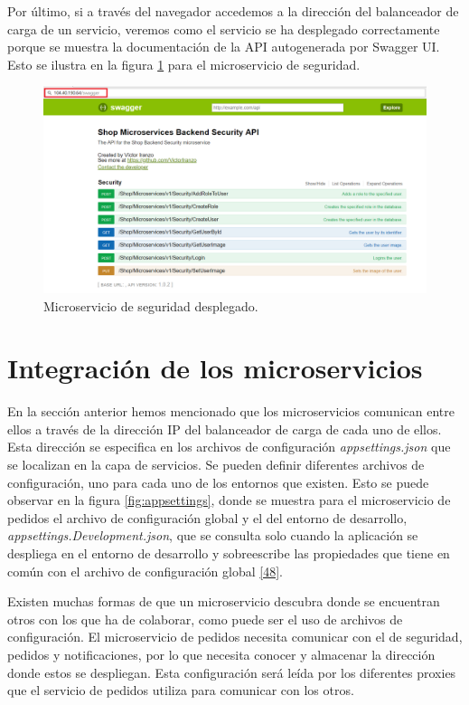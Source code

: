 \documentclass[11pt,spanish,listoffigures]{tfgetsinf}
\begin{document}
Por último, si a través del navegador accedemos a la dirección del balanceador de carga de un servicio, veremos como el servicio se ha desplegado correctamente porque se muestra la documentación de la API autogenerada por Swagger UI. Esto se ilustra en la figura \ref{fig:MicroservicioDesplegado} para el microservicio de seguridad.

\begin{figure}[h]
\centering
\includegraphics[scale=0.5]{MicroservicioDesplegado} 
\caption{Microservicio de seguridad desplegado.}
\label{fig:MicroservicioDesplegado}
\end{figure}

\newpage

\section{Integración de los microservicios}

En la sección anterior hemos mencionado que los microservicios comunican entre ellos a través de la dirección IP del balanceador de carga de cada uno de ellos. Esta dirección se especifica en los archivos de configuración \textit{appsettings.json} que se localizan en la capa de servicios. Se pueden definir diferentes archivos de configuración, uno para cada uno de los entornos que existen. Esto se puede observar en la figura \ref{fig:appsettings}, donde se muestra para el microservicio de pedidos el archivo de configuración global y el del entorno de desarrollo, \textit{appsettings.Development.json}, que se consulta solo cuando la aplicación se despliega en el entorno de desarrollo y sobreescribe las propiedades que tiene en común con el archivo de configuración global \hyperlink{page.80}{[48]}.

Existen muchas formas de que un microservicio descubra donde se encuentran otros con los que ha de colaborar, como puede ser el uso de archivos de configuración. El microservicio de pedidos necesita comunicar con el de seguridad, pedidos y notificaciones, por lo que necesita conocer y almacenar la dirección donde estos se despliegan. Esta configuración será leída por los diferentes proxies que el servicio de pedidos utiliza para comunicar con los otros.
\end{document}
